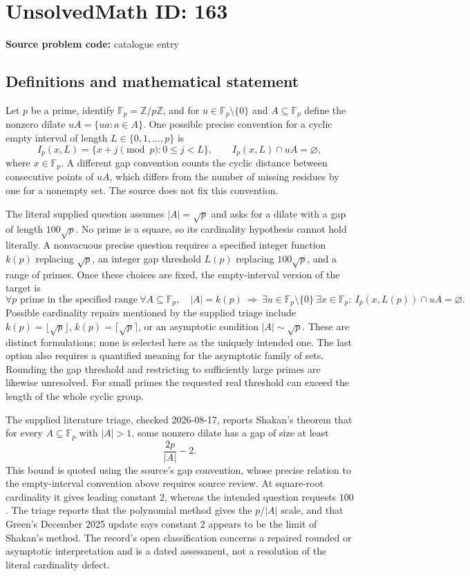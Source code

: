 \documentclass[11pt]{article}
\newcommand{\Z}{\mathbb{Z}}
\newcommand{\F}{\mathbb{F}}
\begin{document}
\section*{UnsolvedMath ID: 163}
\textbf{Source problem code:} catalogue entry
\subsection{Definitions and mathematical statement}
Let $p$ be a prime, identify $\F_p=\Z/p\Z$, and for $u\in\F_p\setminus\{0\}$ and $A\subseteq\F_p$ define the nonzero dilate $uA=\{ua:a\in A\}$. One possible precise convention for a cyclic empty interval of length $L\in\{0,1,\ldots,p\}$ is
\[
I_p(x,L)=\{x+j\pmod p:0\leq j<L\},\qquad I_p(x,L)\cap uA=\varnothing,
\]
where $x\in\F_p$. A different gap convention counts the cyclic distance between consecutive points of $uA$, which differs from the number of missing residues by one for a nonempty set. The source does not fix this convention.

The literal supplied question assumes $|A|=\sqrt p$ and asks for a dilate with a gap of length $100\sqrt p$. No prime is a square, so its cardinality hypothesis cannot hold literally. A nonvacuous precise question requires a specified integer function $k(p)$ replacing $\sqrt p$, an integer gap threshold $L(p)$ replacing $100\sqrt p$, and a range of primes. Once these choices are fixed, the empty-interval version of the target is
\[
\forall p\text{ prime in the specified range}\ \forall A\subseteq\F_p,
\quad |A|=k(p)\ \Longrightarrow\ 
\exists u\in\F_p\setminus\{0\}\ \exists x\in\F_p:\ I_p(x,L(p))\cap uA=\varnothing.
\]
Possible cardinality repairs mentioned by the supplied triage include $k(p)=\lfloor\sqrt p\rfloor$, $k(p)=\lceil\sqrt p\rceil$, or an asymptotic condition $|A|\sim\sqrt p$. These are distinct formulations; none is selected here as the uniquely intended one. The last option also requires a quantified meaning for the asymptotic family of sets. Rounding the gap threshold and restricting to sufficiently large primes are likewise unresolved. For small primes the requested real threshold can exceed the length of the whole cyclic group.

The supplied literature triage, checked 2026-08-17, reports Shakan's theorem that for every $A\subseteq\F_p$ with $|A|>1$, some nonzero dilate has a gap of size at least
\[
\frac{2p}{|A|}-2.
\]
This bound is quoted using the source's gap convention, whose precise relation to the empty-interval convention above requires source review. At square-root cardinality it gives leading constant $2$, whereas the intended question requests $100$. The triage reports that the polynomial method gives the $p/|A|$ scale, and that Green's December 2025 update says constant $2$ appears to be the limit of Shakan's method. The record's open classification concerns a repaired rounded or asymptotic interpretation and is a dated assessment, not a resolution of the literal cardinality defect.
\end{document}
